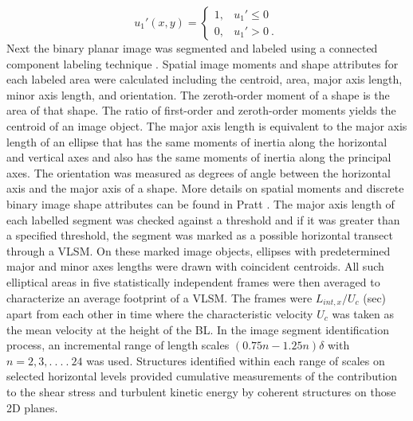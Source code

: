 \begin{equation}
	u_{1}'(x,y) = \begin{cases}	
	1, &\text{$u_{1}' \leq 0$ }\\
	0, &\text{$u_{1}' >  0$}\ .
	\end{cases}
	\label{case:binary-vel}
\end{equation}
\noindent Next the binary planar image was segmented and labeled using a connected component labeling technique \cite{book_comp_vision_davies}. Spatial image moments and shape attributes for each labeled area were calculated including the centroid, area, major axis length, minor axis length, and orientation. The zeroth-order moment of a shape is the area of that shape. The ratio of first-order and zeroth-order moments yields the centroid of an image object. The major axis length is equivalent to the major axis length of an ellipse that has the same moments of inertia along the horizontal and vertical axes and also has the same moments of inertia along the principal axes. The orientation was measured as degrees of angle between the horizontal axis and the major axis of a shape.  More details on spatial moments and discrete binary image shape attributes can be found in  Pratt \cite{book_intro_dimg_proc_pratt}. The major axis length of each labelled segment was checked against a threshold and if it was greater than a specified threshold, the segment was marked as a possible horizontal transect through a VLSM. On these marked image objects, ellipses with predetermined major and minor axes lengths were drawn with coincident centroids. All such elliptical areas in five statistically independent frames were then averaged to characterize an  average footprint of a VLSM. The frames were $L_{int,x}/U_c$ (sec) apart from each other in time where the characteristic velocity $U_c$ was taken as the mean velocity at the height of the BL.  In the image segment identification process, an incremental range of length scales $(0.75n-1.25n)\delta $ with $n= 2,3,.\ .\  .\  . \ 24$ was used.  Structures identified within each  range of scales on selected horizontal levels provided cumulative measurements of the contribution to the shear stress and turbulent kinetic energy by coherent structures on those 2D planes.

